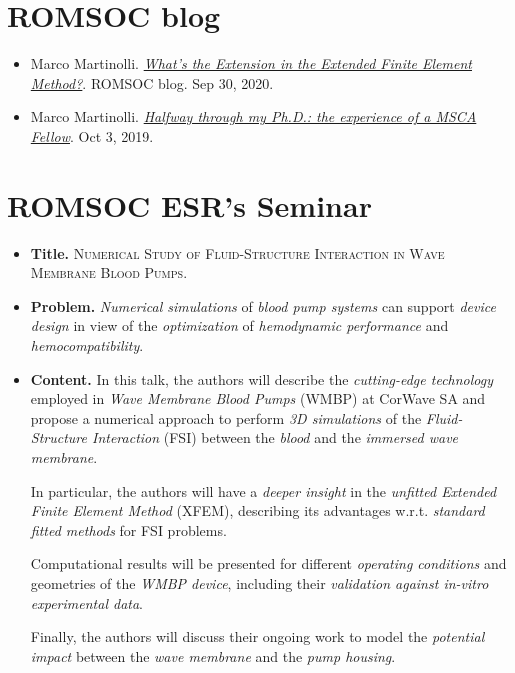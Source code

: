\documentclass{book}
\numberwithin{equation}{section}
\begin{document}
\section{ROMSOC blog}
\begin{itemize}
    \item Marco Martinolli. \href{https://www.romsoc.eu/whats-the-extension-in-the-extended-finite-element-method/}{\textit{What's the Extension in the Extended Finite Element Method?}}. ROMSOC blog. Sep 30, 2020.
    \item Marco Martinolli. \href{https://www.romsoc.eu/halfway-through-my-ph-d-the-experience-of-a-msca-fellow/}{\textit{Halfway through my Ph.D.: the experience of a MSCA Fellow}}. Oct 3, 2019.
\end{itemize}

\section{ROMSOC ESR's Seminar}
\begin{itemize}
    \item \textbf{Title.} \textsc{Numerical Study of Fluid-Structure Interaction in Wave Membrane Blood Pumps}.
    \item \textbf{Problem.} \textit{Numerical simulations} of \textit{blood pump systems} can support \textit{device design} in view of the \textit{optimization} of \textit{hemodynamic performance} and \textit{hemocompatibility}.
    \item \textbf{Content.} In this talk, the authors will describe the \textit{cutting-edge technology} employed in \textit{Wave Membrane Blood Pumps} (WMBP) at CorWave SA and propose a numerical approach to perform \textit{3D simulations} of the \textit{Fluid-Structure Interaction} (FSI) between the \textit{blood} and the \textit{immersed wave membrane}.
    
    In particular, the authors will have a \textit{deeper insight} in the \textit{unfitted Extended Finite Element Method} (XFEM), describing its advantages w.r.t. \textit{standard fitted methods} for FSI problems.
    
    Computational results will be presented for different \textit{operating conditions} and geometries of the \textit{WMBP device}, including their \textit{validation against in-vitro experimental data}.
    
    Finally, the authors will discuss their ongoing work to model the \textit{potential impact} between the \textit{wave membrane} and the \textit{pump housing}.
\end{itemize}
\end{document}
